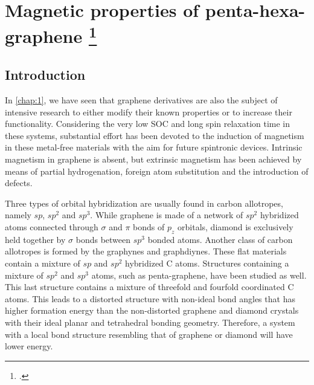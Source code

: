 \section[Magnetic properties of penta-hexa-graphene]{Magnetic properties of penta-hexa-graphene \footcite[This work is published:][]{Aierken2016.magnetism} \label{mag_phg}}

\subsection{Introduction}

In \autoref{chap:1}, we have seen that graphene derivatives \cite{Vasilios2012,Inagaki2014} are also the subject of intensive research to either modify their known properties or to increase their functionality. Considering the very low SOC and long spin relaxation time in these systems, substantial effort has been devoted to the induction of magnetism in these metal-free materials with the aim for future spintronic devices\cite{KAN2008,Kun2015}. Intrinsic magnetism in graphene is absent, but extrinsic magnetism has been achieved by means of partial hydrogenation\cite{Zhou2009,Eng2013}, foreign atom substitution\cite{Okada2001,Miao2016} and the introduction of defects\cite{Pereira2006,Yazyev2007}. 

Three types of orbital hybridization are usually found in carbon allotropes, namely $sp$, $sp^2$ and $sp^3$.  While graphene is made of a network of $sp^2$ hybridized atoms connected through $\sigma$ and $\pi$ bonds of $p_z$ orbitals, diamond is exclusively held together by $\sigma$ bonds between $sp^3$ bonded atoms. Another class of carbon allotropes is formed by the graphynes and graphdiynes\cite{Baughman1987,Ivanovskii20131}. These flat materials contain a mixture of $sp$ and $sp^2$ hybridized C atoms. Structures containing a mixture of $sp^2$ and $sp^3$ atoms, such as penta-graphene\cite{Zhang2015}, have been studied as well. This last structure contains a mixture of threefold and fourfold coordinated C atoms. This leads to a distorted structure with non-ideal bond angles that has higher formation energy than the non-distorted graphene and diamond crystals with their ideal planar and tetrahedral bonding geometry. Therefore, a system with a local bond structure resembling that of graphene or diamond will have lower energy. 

